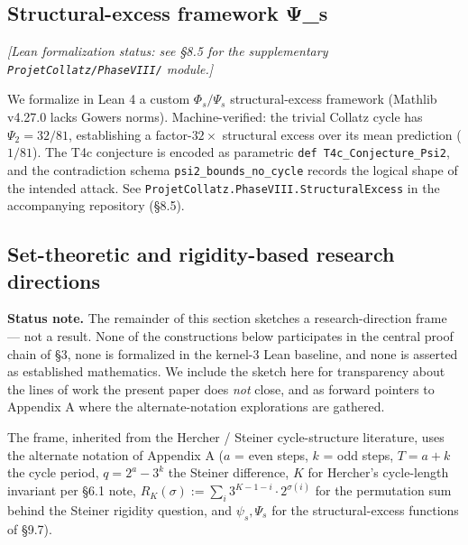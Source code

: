 \documentclass[
  11pt]{amsart}
\newcounter{none} %
\theoremstyle{plain}
\theoremstyle{definition}
\theoremstyle{remark}
\begin{document}
\subsection{Structural-excess framework
Ψ\_s}\label{structural-excess-framework-ux3c8_s}

\emph{{[}Lean formalization status: see §8.5 for the supplementary
\texttt{ProjetCollatz/PhaseVIII/} module.{]}}

We formalize in Lean 4 a custom \(\Phi_s / \Psi_s\) structural-excess
framework (Mathlib v4.27.0 lacks Gowers norms). Machine-verified: the
trivial Collatz cycle has \(\Psi_2 = 32/81\), establishing a
factor-\(32\times\) structural excess over its mean prediction
(\(1/81\)). The T4c conjecture is encoded as parametric
\texttt{def\ T4c\_Conjecture\_Psi2}, and the contradiction schema
\texttt{psi2\_bounds\_no\_cycle} records the logical shape of the
intended attack. See \texttt{ProjetCollatz.PhaseVIII.StructuralExcess}
in the accompanying repository (§8.5).

\subsection{Set-theoretic and rigidity-based research
directions}\label{set-theoretic-and-rigidity-based-research-directions}

\textbf{Status note.} The remainder of this section sketches a
research-direction frame --- not a result. None of the constructions
below participates in the central proof chain of §3, none is formalized
in the kernel-3 Lean baseline, and none is asserted as established
mathematics. We include the sketch here for transparency about the lines
of work the present paper does \emph{not} close, and as forward pointers
to Appendix A where the alternate-notation explorations are gathered.

The frame, inherited from the Hercher / Steiner cycle-structure
literature, uses the alternate notation of Appendix A (\(a\) = even
steps, \(k\) = odd steps, \(T = a + k\) the cycle period,
\(q = 2^a - 3^k\) the Steiner difference, \(K\) for Hercher's
cycle-length invariant per §6.1 note, \(R_K(\sigma) := \sum_i
3^{K-1-i} \cdot 2^{\sigma(i)}\) for the permutation sum behind the
Steiner rigidity question, and \(\psi_s, \Psi_s\) for the
structural-excess functions of §9.7).
\end{document}
